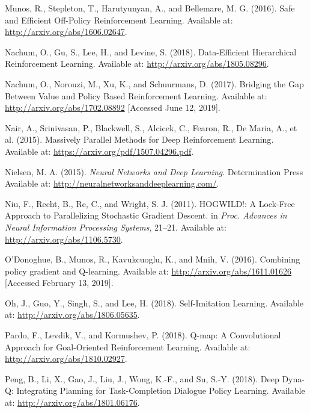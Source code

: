 \documentclass[
  letterpaper,
  DIV=11,
  numbers=noendperiod]{scrreprt}
\newlength{\cslhangindent}
\newlength{\cslentryspacingunit} %
\newenvironment{CSLReferences}[2] %
 {%
  \setlength{\parindent}{0pt}
  \ifodd #1
  \let\oldpar\par
  \def\par{\hangindent=\cslhangindent\oldpar}
  \fi
  \setlength{\parskip}{#2\cslentryspacingunit}
 }%
 {}
\begin{document}
\begin{CSLReferences}{1}{0}
\leavevmode{}%
Munos, R., Stepleton, T., Harutyunyan, A., and Bellemare, M. G. (2016).
Safe and {Efficient Off-Policy Reinforcement Learning}. Available at:
\url{http://arxiv.org/abs/1606.02647}.

\leavevmode{}%
Nachum, O., Gu, S., Lee, H., and Levine, S. (2018). Data-{Efficient
Hierarchical Reinforcement Learning}. Available at:
\url{http://arxiv.org/abs/1805.08296}.

\leavevmode{}%
Nachum, O., Norouzi, M., Xu, K., and Schuurmans, D. (2017). Bridging the
{Gap Between Value} and {Policy Based Reinforcement Learning}. Available
at: \url{http://arxiv.org/abs/1702.08892} {[}Accessed June 12, 2019{]}.

\leavevmode{}%
Nair, A., Srinivasan, P., Blackwell, S., Alcicek, C., Fearon, R., De
Maria, A., et al. (2015). Massively {Parallel Methods} for {Deep
Reinforcement Learning}. Available at:
\url{https://arxiv.org/pdf/1507.04296.pdf}.

\leavevmode{}%
Nielsen, M. A. (2015). \emph{Neural {Networks} and {Deep Learning}}.
{Determination Press} Available at:
\url{http://neuralnetworksanddeeplearning.com/}.

\leavevmode{}%
Niu, F., Recht, B., Re, C., and Wright, S. J. (2011). {HOGWILD}!: {A
Lock-Free Approach} to {Parallelizing Stochastic Gradient Descent}. in
\emph{Proc. {Advances} in {Neural Information Processing Systems}},
21--21. Available at: \url{http://arxiv.org/abs/1106.5730}.

\leavevmode{}%
O'Donoghue, B., Munos, R., Kavukcuoglu, K., and Mnih, V. (2016).
Combining policy gradient and {Q-learning}. Available at:
\url{http://arxiv.org/abs/1611.01626} {[}Accessed February 13, 2019{]}.

\leavevmode{}%
Oh, J., Guo, Y., Singh, S., and Lee, H. (2018). Self-{Imitation
Learning}. Available at: \url{http://arxiv.org/abs/1806.05635}.

\leavevmode{}%
Pardo, F., Levdik, V., and Kormushev, P. (2018). Q-map: A {Convolutional
Approach} for {Goal-Oriented Reinforcement Learning}. Available at:
\url{http://arxiv.org/abs/1810.02927}.

\leavevmode{}%
Peng, B., Li, X., Gao, J., Liu, J., Wong, K.-F., and Su, S.-Y. (2018).
Deep {Dyna-Q}: {Integrating Planning} for {Task-Completion Dialogue
Policy Learning}. Available at: \url{http://arxiv.org/abs/1801.06176}.


\end{CSLReferences}
\end{document}
